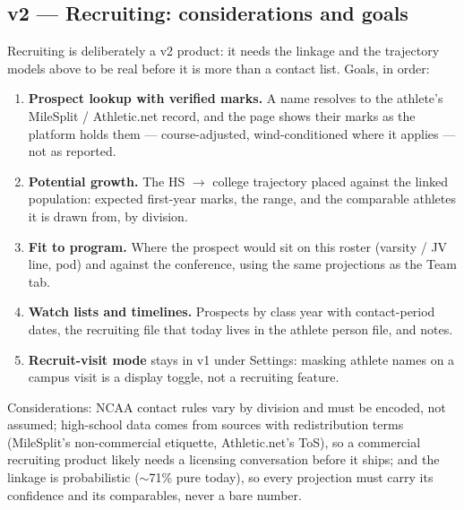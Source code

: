 \subsection{v2 --- Recruiting: considerations and goals}

Recruiting is deliberately a v2 product: it needs the linkage and the
trajectory models above to be real before it is more than a contact list.
Goals, in order:

\begin{enumerate}
  \item \textbf{Prospect lookup with verified marks.} A name resolves to the
    athlete's MileSplit / Athletic.net record, and the page shows their marks
    as the platform holds them --- course-adjusted, wind-conditioned where it
    applies --- not as reported.
  \item \textbf{Potential growth.} The HS $\to$ college trajectory placed
    against the linked population: expected first-year marks, the range, and
    the comparable athletes it is drawn from, by division.
  \item \textbf{Fit to program.} Where the prospect would sit on this roster
    (varsity / JV line, pod) and against the conference, using the same
    projections as the Team tab.
  \item \textbf{Watch lists and timelines.} Prospects by class year with
    contact-period dates, the recruiting file that today lives in the athlete
    person file, and notes.
  \item \textbf{Recruit-visit mode} stays in v1 under Settings: masking
    athlete names on a campus visit is a display toggle, not a recruiting
    feature.
\end{enumerate}

Considerations: NCAA contact rules vary by division and must be encoded, not
assumed; high-school data comes from sources with redistribution terms
(MileSplit's non-commercial etiquette, Athletic.net's ToS), so a commercial
recruiting product likely needs a licensing conversation before it ships; and the
linkage is probabilistic ($\sim$71\% pure today), so every projection must
carry its confidence and its comparables, never a bare number.
